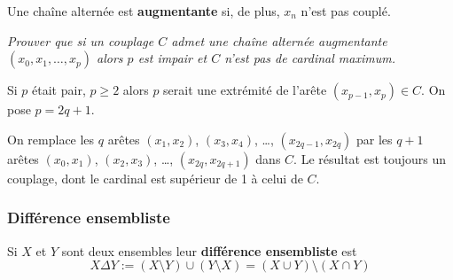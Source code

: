 \smallskip

Une chaîne alternée est {\bf augmentante} si, de plus, $x_n$ n'est pas couplé.

\begin{Exercise}[title=Augmentation]\it 
Prouver que si un couplage $C$ admet une chaîne alternée augmentante $(x_0,x_1,\ldots,x_p)$ alors $p$ est impair et $C$ n'est pas de cardinal maximum.
\end{Exercise}
\begin{Answer} 

Si $p$ était pair, $p\ge 2$ alors $p$ serait une extrémité de l'arête $(x_{p-1}, x_p)\in C$.
On pose $p = 2q + 1$.

On remplace les $q$ arêtes $(x_1, x_2)$, $(x_3, x_4)$, \dots, $(x_{2q-1}, x_{2q})$ par les 
$q+1$ arêtes $(x_0, x_1)$, $(x_2, x_3)$, \dots, $(x_{2q}, x_{2q+1})$ dans $C$. Le résultat est toujours un couplage, dont le cardinal est supérieur de 1 à celui de $C$.
\end{Answer}
\subsubsection{Différence ensembliste} 

Si $X$ et $Y$ sont deux ensembles leur {\bf différence ensembliste} est
\[X\Delta Y := (X\setminus Y) \cup (Y\setminus X) = (X\cup Y) \setminus (X\cap Y)\]

